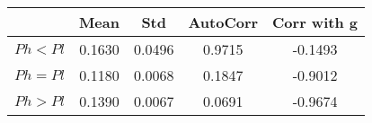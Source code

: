 \begin{tiny}\begin{tabular}{|l|c|c|c|c|}
\hline
&\textbf{Mean}&\textbf{Std}&\textbf{AutoCorr}&\textbf{Corr with g}\\\hline
\textbf{$Ph<Pl$}&0.1630&0.0496&0.9715&-0.1493\\\hline
\textbf{$Ph=Pl$}&0.1180&0.0068&0.1847&-0.9012\\\hline
\textbf{$Ph>Pl$}&0.1390&0.0067&0.0691&-0.9674\\\hline
\end{tabular}
\end{tiny}